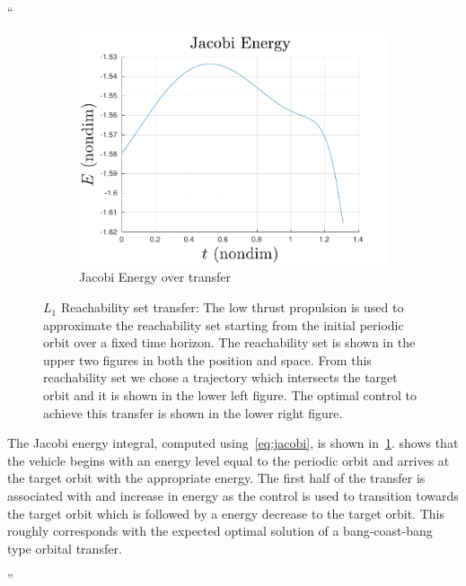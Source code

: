 \documentclass[11pt]{article}
\newenvironment{correction}{\begin{list}{}{\setlength{\leftmargin}{1cm}\setlength{\rightmargin}{1cm}}\vspace{\parsep}\item[]``}{''\end{list}}
\begin{document}
\begin{itemize}
\begin{correction}
\begin{figure}
                \begin{subfigure}[htbp]{0.4\textwidth} 
                    \includegraphics[width=\textwidth, keepaspectratio]{figures/l1_transfer/jacobi.pdf} 
                    \caption{Jacobi Energy over transfer \label{fig:jacobi_l1}} 
                \end{subfigure} 

                \caption{\( L_1 \) Reachability set transfer: The low thrust propulsion is used to approximate the reachability set starting from the initial periodic orbit over a fixed time horizon.
                    The reachability set is shown in the upper two figures in both the position and \Poincare space.
                    From this reachability set we chose a trajectory which intersects the target orbit and it is shown in the lower left figure.
                The optimal control to achieve this transfer is shown in the lower right figure.}
                \label{fig:reachability_set_transfer} 
            \end{figure}

            The Jacobi energy integral, computed using~\cref{eq:jacobi}, is shown in~\cref{fig:jacobi_l1}.
             shows that the vehicle begins with an energy level equal to the periodic orbit and arrives at the target orbit with the appropriate energy.
            The first half of the transfer is associated with and increase in energy as the control is used to transition towards the target orbit which is followed by a energy decrease to the target orbit.
            This roughly corresponds with the expected optimal solution of a bang-coast-bang type orbital transfer.


\end{correction}
\end{itemize}
\end{document}
